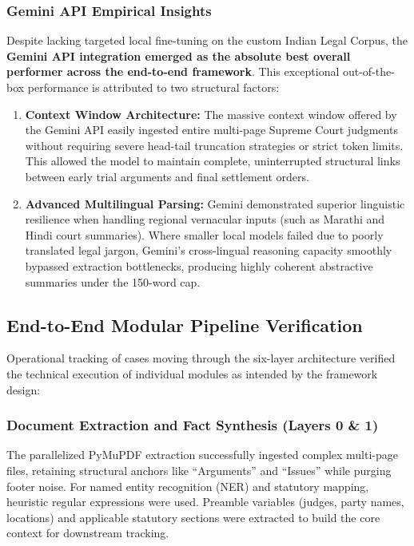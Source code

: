 \subsubsection{Gemini API Empirical Insights}
Despite lacking targeted local fine-tuning on the custom Indian Legal Corpus, the \textbf{Gemini API integration emerged as the absolute best overall performer across the end-to-end framework}. This exceptional out-of-the-box performance is attributed to two structural factors:
\begin{enumerate}
	\item \textbf{Context Window Architecture:} The massive context window offered by the Gemini API easily ingested entire multi-page Supreme Court judgments without requiring severe head-tail truncation strategies or strict token limits. This allowed the model to maintain complete, uninterrupted structural links between early trial arguments and final settlement orders.
	\item \textbf{Advanced Multilingual Parsing:} Gemini demonstrated superior linguistic resilience when handling regional vernacular inputs (such as Marathi and Hindi court summaries). Where smaller local models failed due to poorly translated legal jargon, Gemini's cross-lingual reasoning capacity smoothly bypassed extraction bottlenecks, producing highly coherent abstractive summaries under the 150-word cap.
\end{enumerate}

\subsection{End-to-End Modular Pipeline Verification}
Operational tracking of cases moving through the six-layer architecture verified the technical execution of individual modules as intended by the framework design:

\subsubsection{Document Extraction and Fact Synthesis (Layers 0 \& 1)}
The parallelized PyMuPDF extraction successfully ingested complex multi-page files, retaining structural anchors like ``Arguments'' and ``Issues'' while purging footer noise. For named entity recognition (NER) and statutory mapping, heuristic regular expressions were used. Preamble variables (judges, party names, locations) and applicable statutory sections were extracted to build the core context for downstream tracking.

